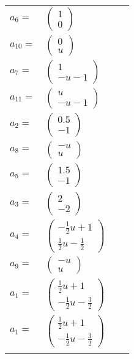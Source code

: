 \documentclass[1p]{elsarticle_modified}
\theoremstyle{definition}
\begin{document}
\begin{tabular}{m{7pt} m{180pt} m{7pt} m{180pt} }
\flushright $a_{6}=$&$\begin{pmatrix}1\\0\end{pmatrix}$ \\
\flushright $a_{10}=$&$\begin{pmatrix}0\\u\end{pmatrix}$ \\
\flushright $a_{7}=$&$\begin{pmatrix}1\\- u-1\end{pmatrix}$ \\
\flushright $a_{11}=$&$\begin{pmatrix}u\\- u-1\end{pmatrix}$ \\
\flushright $a_{2}=$&$\begin{pmatrix}0.5\\-1\end{pmatrix}$ \\
\flushright $a_{8}=$&$\begin{pmatrix}- u\\u\end{pmatrix}$ \\
\flushright $a_{5}=$&$\begin{pmatrix}1.5\\-1\end{pmatrix}$ \\
\flushright $a_{3}=$&$\begin{pmatrix}2\\-2\end{pmatrix}$ \\
\flushright $a_{4}=$&$\begin{pmatrix}-\frac{1}{2} u+1\\\frac{1}{2} u-\frac{1}{2}\end{pmatrix}$ \\
\flushright $a_{9}=$&$\begin{pmatrix}- u\\u\end{pmatrix}$ \\
\flushright $a_{1}=$&$\begin{pmatrix}\frac{1}{2} u+1\\-\frac{1}{2} u-\frac{3}{2}\end{pmatrix}$\\ \flushright $a_{1}=$&$\begin{pmatrix}\frac{1}{2} u+1\\-\frac{1}{2} u-\frac{3}{2}\end{pmatrix}$\\&\end{tabular}
\end{document}
